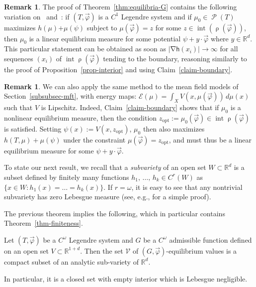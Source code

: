 \documentclass[10pt]{amsart}
\theoremstyle{definition}\newtheorem{defi}[theo]{Definition}\newtheorem{rema}[theo]{Remark}\newtheorem{exam}[theo]{Example}\newtheorem{exem}[theo]{Example}\newtheorem{nota}[theo]{Notation}
\theoremstyle{plain}
\theoremstyle{plain}
\newcommand\vpot{\vec\pot}
\newcommand\inter{\operatorname{int}}
\newcommand\Prob{{\operatorname{\mathscr{P}}}}
\newcommand{\rs}{\operatorname{\rho}}
\newcommand{\grad}{\operatorname{\nabla}}
\newcommand{\opt}{\mathrm{opt}}
\newcommand{\hf}{\mathsf{h}}
\newcommand{\pot}{\varphi}
\newcounter{In}
\newcommand*\8{\infty}
\newcommand\RR{\mathbb{R}}
\newcommand{\En}{\mathcal{E}}
\newcommand{\scV}{\mathscr{V}}
\begin{document}
\begin{rema}\label{rem-max-ent-cond}
The proof of Theorem~\ref{thm:equilibria-G} contains the following variation on~\cite[Theorem~B]{KW2015} and~\cite[Theorem~G]{GKLM}: if $(T,\vec\pot)$ is a $C^1$ Legendre system and if $\mu_{0}\in\Prob(T)$ maximizes $h(\mu) { +\mu(\psi)}$ subject to $\mu(\vec\pot)=z$ for some $z\in\inter(\rs(\vec\pot))$, then $\mu_0$ is a linear equilibrium measure for some potential $\psi+y\cdot \vec\varphi$ where $y\in\RR^d$. This particular statement can be obtained as soon as $\lvert \grad \hf(x_i)\rvert\to\infty$ for all sequences $(x_i)$ of $\inter\rs(\vec \varphi)$ tending to the boundary, reasoning similarly to the proof of Proposition~\ref{prop-interior} and using Claim~\ref{claim-boundary}.
\end{rema}

\begin{rema}
We can also apply the same method to the mean field models of Section~\ref{subsubsec-mft}, with energy maps: $\En(\mu)=\int_X V(x,\mu(\vec\pot))\, d\mu(x)$ such that $V$ is Lipschitz. Indeed, Claim~\ref{claim-boundary} shows that if $\mu_0$ is a nonlinear equilibrium measure, then the condition $z_{\opt}:=\mu_{ 0}(\vec\pot)\in\inter\rs(\vec\pot)$ is satisfied. Setting $\psi(x):=V(x,z_{\opt})$, $\mu_0$ then also maximizes $h(T,\mu)+\mu(\psi)$ under the constraint $\mu(\vec \varphi)=z_{\opt}$, and must thus be a linear equilibrium measure for some $\psi+y\cdot \vec \varphi$.
\end{rema}

To state our next result, we recall that a \emph{subvariety} of an open set $W\subset\RR^d$ is a subset defined by finitely many functions $h_1,\,\dots,\,h_k\in C^r(W)$ as $\{x\in W: h_1(x)=\dots=h_k(x)\}$. If $r=\omega$, it is easy to see that any nontrivial subvariety has zero Lebesgue measure (see, e.g., \cite{Mityagin} for a simple proof).


The previous theorem implies the following, which in particular contains Theorem~\ref{thm-finiteness}.

\begin{coro}
Let $(T, \vpot)$ be a $C^\omega$ Legendre system and $G$ be a $C^\omega$ admissible function defined on an open set $V\subset \RR^{1+d}$. Then the set $\scV$ of $(G,\vpot)$-equilibrium values is a compact subset of an analytic sub-variety of $\RR^d$.

In particular, it is a closed set with empty interior which is Lebesgue negligible.
\end{coro}
\end{document}
